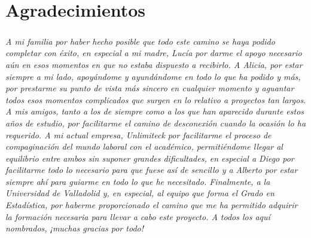 \documentclass{subfiles}
\begin{document}
  \chapter*{Agradecimientos}
  \label{sec:acknowledgements}

    \paragraph{}
    \emph{A mi familia por haber hecho posible que todo este camino se haya podido completar con éxito, en especial a mi madre, Lucía por darme el apoyo necesario aún en esos momentos en que no estaba dispuesto a recibirlo. A Alicia, por estar siempre a mi lado, apoyándome y ayundándome en todo lo que ha podido y más, por prestarme su punto de vista más sincero en cualquier momento y aguantar todos esos momentos complicados que surgen en lo relativo a proyectos tan largos. A mis amigos, tanto a los de siempre como a los que han aparecido durante estos años de estudio, por facilitarme el camino de desconexión cuando la ocasión lo ha requerido. A mi actual empresa, Unlimiteck por facilitarme el proceso de compaginación del mundo laboral con el académico, permitiéndome llegar al equilibrio entre ambos sin suponer grandes dificultades, en especial a Diego por facilitarme todo lo necesario para que fuese así de sencillo y a Alberto por estar siempre ahí para guiarme en todo lo que he necesitado. Finalmente, a la Universidad de Valladolid y, en especial, al equipo que forma el Grado en Estadística, por haberme proporcionado el camino que me ha permitido adquirir la formación necesaria para llevar a cabo este proyecto. A todos los aquí nombrados, ¡muchas gracias por todo!}
\end{document}
